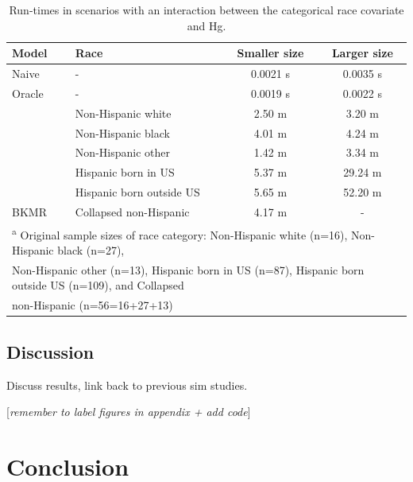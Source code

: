 \documentclass[12pt, twoside]{amherstthesis}
\begin{document}
\begin{table}

\caption{\label{tab:runtimesre}Run-times in scenarios with an interaction between the categorical race covariate and Hg.}
\centering
\begin{tabular}[t]{llcc}
\toprule
Model & Race & Smaller size & Larger size\\
\midrule
Naive & - & 0.0021 s & 0.0035 s\\
\addlinespace
Oracle & - & 0.0019 s & 0.0022 s\\
\addlinespace
 & Non-Hispanic white & 2.50 m & 3.20 m\\

 & Non-Hispanic black & 4.01 m & 4.24 m\\

 & Non-Hispanic other & 1.42 m & 3.34 m\\

 & Hispanic born in US & 5.37 m & 29.24 m\\

 & Hispanic born outside US & 5.65 m & 52.20 m\\

\multirow{-6}{*}{\raggedright\arraybackslash BKMR} & Collapsed non-Hispanic & 4.17 m & -\\
\bottomrule
\multicolumn{4}{l}{\textsuperscript{a} Original sample sizes of race category: Non-Hispanic white (n=16), Non-Hispanic black (n=27),}\\
\multicolumn{4}{l}{Non-Hispanic other (n=13), Hispanic born in US (n=87), Hispanic born outside US (n=109), and Collapsed}\\
\multicolumn{4}{l}{non-Hispanic (n=56=16+27+13)}\\
\end{tabular}
\end{table}
\hypertarget{discussion}{%
\section{Discussion}\label{discussion}}

Discuss results, link back to previous sim studies.

{[}\emph{remember to label figures in appendix + add code}{]}

\hypertarget{conclusion}{%
\chapter*{Conclusion}\label{conclusion}}
\end{document}
